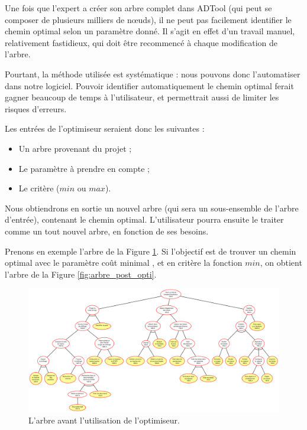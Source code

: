 		Une fois que l'expert a créer son arbre complet dans ADTool (qui peut se composer de plusieurs milliers de nœuds), il ne peut pas facilement identifier le chemin optimal selon un paramètre donné. Il s'agit en effet d'un travail manuel, relativement fastidieux, qui doit être recommencé à chaque modification de l'arbre. 
		
		Pourtant, la méthode utilisée est systématique : nous pouvons donc l'automatiser dans notre logiciel. Pouvoir identifier automatiquement le chemin optimal ferait gagner beaucoup de temps à l'utilisateur, et permettrait aussi de limiter les risques d'erreurs.

		Les entrées de l'optimiseur seraient donc les suivantes :
		\begin{itemize}
			\item Un arbre provenant du projet ;
			\item Le paramètre à prendre en compte ;
			\item Le critère ($min$ ou $max$).
		\end{itemize}

		Nous obtiendrons en sortie un nouvel arbre (qui sera un sous-ensemble de l'arbre d'entrée), contenant le chemin optimal. L'utilisateur pourra ensuite le traiter comme un tout nouvel arbre, en fonction de ses besoins.
		
		Prenons en exemple l'arbre de la {\sc Figure} \ref{fig:pre_optimiseur}. Si l'objectif est de trouver un chemin optimal avec le paramètre \og coût minimal \fg{}, et en critère la fonction $min$, on obtient l'arbre de la {\sc Figure} \ref{fig:arbre_post_opti}.
		
		\begin{landscape}
	        \begin{figure}
	            \includegraphics[height=0.82\textwidth]{figure/pre_optimiseur.pdf}
	            \caption{L'arbre avant l'utilisation de l'optimiseur.}
	            \label{fig:pre_optimiseur}
	        \end{figure}
    	\end{landscape}		
		
